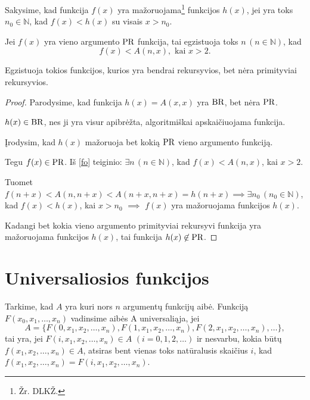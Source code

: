 \begin{defn}
  Sakysime, kad funkcija $f(x)$ yra mažoruojama\footnote{Žr. DLKŽ.} 
  funkcijos $h(x)$, jei
  yra toks $n_{0} \in \mathbb{N}$, kad $f(x) < h(x)$ su visais $x > n_{0}$.
\end{defn}

\begin{prop}
  \label{fo}
  Jei $f(x)$ yra vieno argumento $\mathop{\text{PR}}$ funkcija, tai egzistuoja toks
  $n\,(n \in \mathbb{N})$, kad
  \[
  f(x) < A(n,x), \text{ kai } x > 2.
  \]
\end{prop}

\begin{prop}
  Egzistuoja tokios funkcijos, kurios yra bendrai rekursyvios, bet nėra
  primityviai rekursyvios.

  \begin{proof}
    Parodysime, kad funkcija $h(x) = A(x,x)$ yra $\mathop{\text{BR}}$, bet nėra $\mathop{\text{PR}}$.

    $h(x) \in \mathop{\text{BR}}$, nes ji yra visur apibrėžta, algoritmiškai 
    apskaičiuojama funkcija.

    Įrodysim, kad $h(x)$ mažoruoja bet kokią $\mathop{\text{PR}}$ vieno argumento 
    funkciją.

    Tegu $f(x) \in \mathop{\text{PR}}$. Iš \ref{fo} teiginio: 
    $\exists n\,(n \in \mathbb{N})$, kad $f(x) < A(n,x)$, kai $x > 2$.

    Tuomet $f(n+x) < A(n,n+x) < A(n+x,n+x) = h(n+x) \implies %
    \exists n_{0} \, (n_{0} \in \mathbb{N})$, kad $f(x) < h(x)$, kai
    $x > n_{0}$ $\implies$ $f(x)$ yra mažoruojama funkcijos $h(x)$.

    Kadangi bet kokia vieno argumento primityviai rekursyvi funkcija yra
    mažoruojama funkcijos $h(x)$, tai funkcija $h(x) \not \in \mathop{\text{PR}}$.
  \end{proof}
  
\end{prop}

\section{Universaliosios funkcijos}

\begin{defn}
  Tarkime, kad $A$ yra kuri nors $n$ argumentų funkcijų aibė. 
  Funkciją $F(x_0,x_1,\dotsc,x_n)$ vadinsime aibės A universaliąja, jei
  \begin{equation*}
    A = \{ F(0,x_1,x_2,\dotsc,x_n), F(1, x_1, x_2, \dotsc, x_n),
    F(2,x_1,x_2,\dotsc,x_n), \dotsc \},
  \end{equation*}
  tai yra, jei $F(i, x_1,x_2,\dotsc,x_n) \in A$ $(i = 0,1,2,\dotsc)$ ir
  nesvarbu, kokia būtų $f(x_1,x_2,\dotsc,x_n) \in A$, atsiras bent
  vienas toks natūralusis skaičius $i$, kad $f(x_1,x_2,\dotsc,x_n) =
  F(i,x_1,x_2,\dotsc,x_n)$.
\end{defn}

